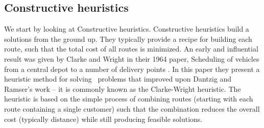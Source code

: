 \subsection{Constructive heuristics}

% 
% 

We start by looking at Constructive heuristics. Constructive heuristics build a solutions from the ground up. They typically provide a recipe for building each route, such that the total cost of all routes is minimized. An early and influential result was given by Clarke and Wright in their 1964 paper, Scheduling of vehicles from a central depot to a number of delivery points \cite{clark:1964}. In this paper they present a heuristic method for solving \VRP\ problems that improved upon Dantzig and Ramser's work -- it is commonly known as the Clarke-Wright heuristic. The heuristic is based on the simple process of combining routes (starting with each route containing a single customer) such that the combination reduces the overall cost (typically distance) while still producing feasible solutions.


